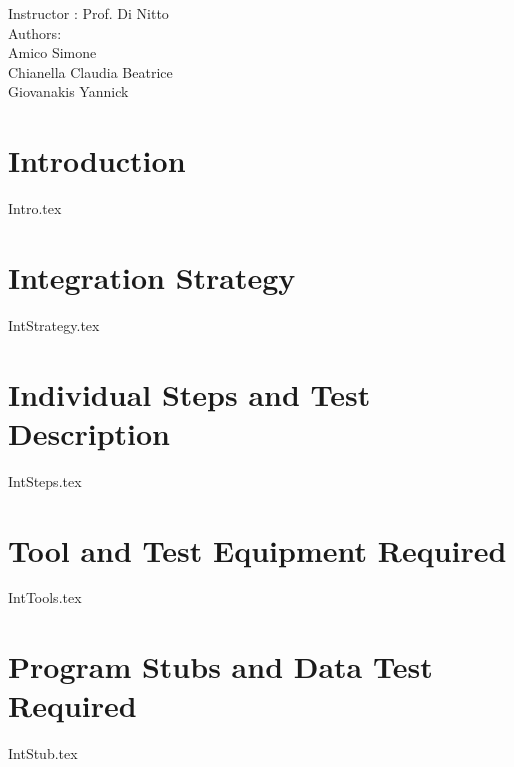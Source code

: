 \documentclass[12pt]{article}
\begin{document}
	\begin{center}
	 	{\Large Instructor : Prof. Di Nitto}
	 	 \vspace{5mm}\\	 
	 	{\Large Authors:}\\
	 	{\Large Amico Simone}\\
	 	{\Large Chianella Claudia Beatrice}\\
	 	{\Large Giovanakis Yannick}
	\end{center}
	 
	\newpage
	
	
	\tableofcontents{}
	 
	\newpage
		
	
	\section{Introduction}
	{Intro.tex}
	\newpage
	
	\section{Integration Strategy}
	{IntStrategy.tex}
	\newpage
	\section{Individual Steps and Test Description}
	\label{sec:IndSteps}
	{IntSteps.tex}	
	\clearpage
	
	\section{Tool and Test Equipment Required}
	
	{IntTools.tex}	
	\newpage
	
	\section{Program Stubs and Data Test Required}
	{IntStub.tex}
	\newpage
\end{document}

